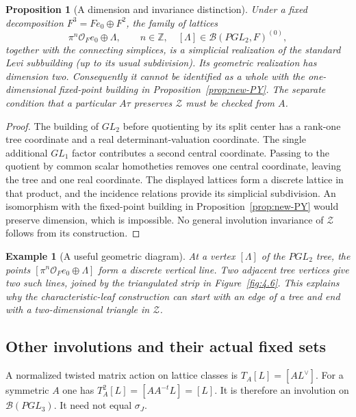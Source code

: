 \documentclass[12pt,letterpaper]{amsart}
\numberwithin{equation}{section}
\newtheorem{proposition}[theorem]{Proposition}
\newtheorem{example}[theorem]{Example}
\theoremstyle{definition}
\theoremstyle{plain}
\begin{document}
\begin{proposition}[A dimension and invariance distinction]
\label{prop:new-Z}
Under a fixed decomposition $F^3=F e_0\oplus F^2$, the family of
lattices
\[
 \pi^n\mathcal O_Fe_0\oplus\Lambda,
 \qquad n\in\mathbb Z,\quad
 [\Lambda]\in\mathcal B(PGL_2,F)^{(0)},
\]
together with the connecting simplices, is a simplicial realization
of the standard Levi subbuilding (up to its usual subdivision). Its
geometric realization has dimension two. Consequently it cannot be
identified as a whole with the one-dimensional fixed-point building
in Proposition~\ref{prop:new-PY}. The separate condition that a
particular $A\tau$ preserves $\mathcal Z$ must be checked from $A$.
\end{proposition}
\begin{proof}
The building of $GL_2$ before quotienting by its split center
has a rank-one tree coordinate and a real determinant-valuation
coordinate. The single additional $GL_1$ factor contributes a second
central coordinate. Passing to the quotient by common scalar
homotheties removes one central coordinate, leaving the tree and one
real coordinate. The displayed lattices form a discrete lattice in
that product, and the incidence relations provide its simplicial
subdivision. An isomorphism with the fixed-point building in
Proposition~\ref{prop:new-PY} would preserve dimension, which is
impossible. No general involution invariance of $\mathcal Z$
follows from its construction.
\end{proof}

\begin{example}[A useful geometric diagram]
At a vertex $[\Lambda]$ of the $PGL_2$ tree, the points
$[\pi^n\mathcal O_Fe_0\oplus\Lambda]$ form a discrete vertical
line. Two adjacent tree vertices give two such lines, joined by the
triangulated strip in Figure~\ref{fig:4.6}. This explains why the
characteristic-leaf construction can start with an edge of a tree
and end with a two-dimensional triangle in $\mathcal Z$.
\end{example}

\subsection{Other involutions and their actual fixed sets}
A normalized twisted matrix action on lattice classes is
$T_A[L]=[A L^\vee]$. For a symmetric $A$ one has
$T_A^2[L]=[AA^{-t}L]=[L]$. It is therefore an involution on
$\mathcal B(PGL_3)$. It need not equal $\sigma_J$.
\end{document}
